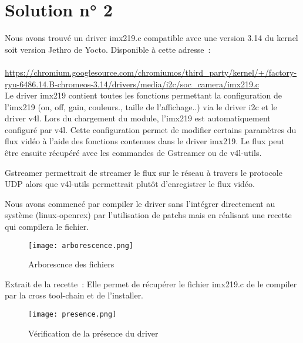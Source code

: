 
\chapter{Solution n° 2} %

\label{Chapter3} %


Nous avons trouvé un driver imx219.c compatible avec une version 3.14 du kernel soit
version Jethro de Yocto. Disponible à cette adresse : \\ \\
\href{https://chromium.googlesource.com/chromiumos/third_party/kernel/+/factory-ryu-6486.14.B-chromeos-3.14/drivers/media/i2c/soc_camera/imx219.c}{https://chromium.googlesource.com/chromiumos/third\_party/kernel/+/factory-ryu-6486.14.B-chromeos-3.14/drivers/media/i2c/soc\_camera/imx219.c} \\

Le driver imx219 contient toutes les fonctions permettant la configuration de l’imx219
(on, off, gain, couleurs., taille de l’affichage..) via le driver i2c et le driver v4l.
Lors du chargement du module, l’imx219 est automatiquement configuré par v4l. Cette
configuration permet de modifier certains paramètres du flux vidéo à l’aide des fonctions
contenues dans le driver imx219. Le flux peut être ensuite récupéré avec les commandes de
Gstreamer ou de v4l-utils.

Gstreamer permettrait de streamer le flux sur le réseau à travers le protocole UDP alors
que v4l-utils permettrait plutôt d’enregistrer le flux vidéo.

Nous avons commencé par compiler le driver sans l’intégrer directement au système
(linux-openrex) par l’utilisation de patchs mais en réalisant une recette qui compilera
le fichier.

\begin{figure}[th]
    \centering
    \texttt{[image: arborescence.png]}
    \decoRule
    \caption{Arborescnce des fichiers}  \label{fig:arbor}   
\end{figure}

Extrait de la recette : Elle permet de récupérer le fichier imx219.c de le compiler par la cross tool-chain et de l’installer.

\begin{figure}[th]
    \centering
    \texttt{[image: presence.png]}
    \decoRule
    \caption{Vérification de la présence du driver}  \label{fig:pres}   
\end{figure}

